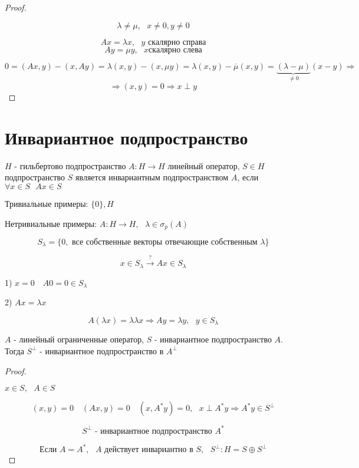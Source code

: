 \documentclass[12pt, a4paper]{report}
\begin{document}
\fi


\begin{proof} \(  \) 

    \[ \lambda \neq \mu , \text{ }  x \neq   0 , y \neq  0 \] 

    \[ A x = \lambda x ,\text{ } y \text{ скалярно справа}   \] 
    \[ Ay = \mu y ,\text{ }  x \text{скалярно слева}  \] 

    \[ 0 = (A x , y ) - (x ,A y )  = \lambda(x ,y ) - ( x, \mu y ) = \lambda (x,y ) - \overline{\mu }(x, y) = \underbrace{(\lambda - \mu )}_{\neq  0}(x- y ) \Rightarrow     \]  
    \[ \Rightarrow (x, y ) = 0 \Rightarrow x \perp  y\]  

\end{proof}

\section{Инвариантное подпространство}

\begin{definition}
 \( H  \) - гильбертово подпространство \( A : H \to  H  \) линейный оператор, \( S \in  H  \) подпространство \( S \) является инвариантным подпространством \( A \), если \( \forall  x \in  S \text{ }  Ax \in  S  \) 
\end{definition}

Тривиальные примеры:  \( \{ 0 \} ,H  \) 

Нетривиальные примеры:  \( A : H \to  H , \text{ }  \lambda \in  \sigma_p (A ) \) 

\[ S_{\lambda } = \{0 , \text{ все собственные векторы отвечающие собственным } \lambda \}  \] 

\[ x \in  S_{ \lambda } \xrightarrow{? }  A x \in S_{\lambda}    \] 

1) \(  x = 0 \quad  A 0  = 0 \in  S_{\lambda}  \) 

2) \( A x = \lambda x  \) 

\[ A (\lambda x ) = \lambda \lambda x \Rightarrow A y = \lambda y , \text{ }  y \in  S_{\lambda}  \] 

\begin{theorem}
\( A  \) - линейный ограниченные оператор, \( S \) - инвариантное подпространство \( A \). Тогда \( S ^{ \perp  }  \) - инвариантное подпространство в \( A ^{ \perp }  \) 
\end{theorem}

\begin{proof} \(  \) 

    \( x \in  S , \text{ }  A \in   S \)
    
    \[ (x, y) =0  \quad  (A x , y ) = 0 \quad  (x , A ^* y ) = 0 , \text{ }  x \perp  A^* y \Rightarrow A ^* y \in  S^{ \perp } \]  

    \[ S ^{\perp  } \text{ - инвариантное подпространство } A ^*   \] 

    \[\text{Если }  A = A ^* , \text{  }  A \text{ действует инвариантно в } S , \text{ }  S^{ \perp } : H = S \oplus S^{ \perp }    \] 

\end{proof}
\end{document}
